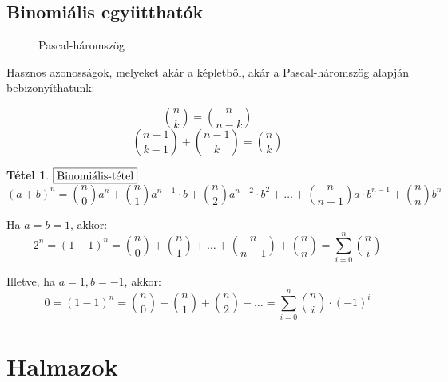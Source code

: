 \documentclass[a4paper,12pt,twoside]{book}
\newtheorem{tetel}{Tétel}[chapter]
\theoremstyle{break}
\begin{document}
\section{Binomiális együtthatók}

\begin{wrapfigure}{r}{0.45\textwidth}
  \vspace{-25pt}
  \begin{center}
\vspace{4pt}
Pascal-háromszög
\end{center}
\vspace{-20pt}
\end{wrapfigure}

Hasznos azonosságok, melyeket akár a képletből, akár a Pascal-háromszög alapján bebizonyíthatunk:

\[\boxed{\binom{n}{k} = \binom{n}{n-k}}\]
\[\boxed{\binom{n-1}{k-1} + \binom{n-1}{k} = \binom{n}{k}}\]

\begin{tetel} $\boxed{$Binomiális-tétel$}$
\[(a+b)^n = \binom{n}{0}a^n + \binom{n}{1}a^{n-1}\cdot b + \binom{n}{2}a^{n-2}\cdot b^2 + \ldots + \binom{n}{n-1}a\cdot b^{n-1} + \binom{n}{n}b^n\]
\end{tetel}
\addtocounter{biz}{1} %

Ha $a=b=1$, akkor:
\[2^n = (1+1)^n = \binom{n}{0}+\binom{n}{1}+\ldots+\binom{n}{n-1}+\binom{n}{n} = \sum^{n}_{i=0} \binom{n}{i}\]

Illetve, ha $a=1, b=-1$, akkor:
\[0 = (1-1)^n = \binom{n}{0}-\binom{n}{1} + \binom{n}{2}-\ldots = \sum^{n}_{i=0} \binom{n}{i}\cdot(-1)^i\]

\chapter{Halmazok}
\end{document}
